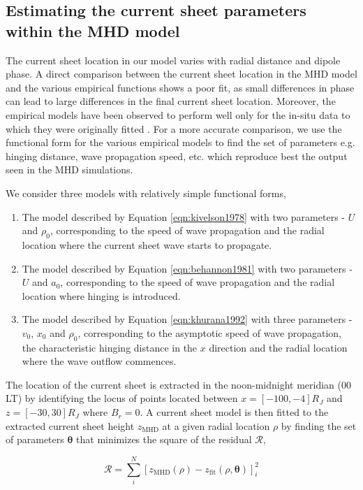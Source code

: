 \subsection{Estimating the current sheet parameters within the MHD model}
The current sheet location in our model varies with radial distance and dipole phase. A direct comparison between the current sheet location in the MHD model and the various empirical functions shows a poor fit, as small differences in phase can lead to large differences in the final current sheet location. Moreover, the empirical models have been observed to perform well only for the in-situ data to which they were originally fitted \cite{Khurana1992a, Behannon1981}. For a more accurate comparison, we use the functional form for the various empirical models to find the set of parameters e.g. hinging distance, wave propagation speed, etc. which reproduce best the output seen in the MHD simulations.

We consider three models with relatively simple functional forms,
\begin{enumerate}
    \item The  model described by Equation \ref{eqn:kivelson1978} with two parameters - $U$ and $\rho_0$, corresponding to the speed of wave propagation and the radial location where the current sheet wave starts to propagate. 
    \item The  model described by Equation \ref{eqn:behannon1981} with two parameters - $U$ and $a_0$, corresponding to the speed of wave propagation and the radial location where hinging is introduced.
    \item The  model described by Equation \ref{eqn:khurana1992} with three parameters - $v_0$, $x_0$ and $\rho_0$, corresponding to the asymptotic speed of wave propagation, the characteristic hinging distance in the $x$ direction and the radial location where the wave outflow commences. 
\end{enumerate}

The location of the current sheet is extracted in the noon-midnight meridian (00 LT) by identifying the locus of points located between $x=[-100, -4] R_J$ and $z=[-30, 30] R_J$ where  $B_r=0$. A current sheet model is then fitted to the extracted current sheet height $z_\text{MHD}$ at a given radial location $\rho$ by finding the set of parameters $\boldsymbol\theta$ that minimizes the square of the residual $\mathcal{R}$,

\begin{equation}
    \mathcal{R} = \sum_i^N \left[ z_\text{MHD}(\rho) - z_\text{fit} (\rho, \boldsymbol\theta) \right]_i^2
\end{equation}

